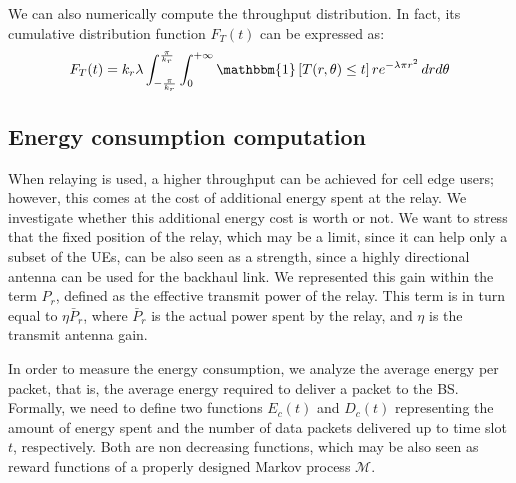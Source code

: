 \documentclass[12pt, letterpaper, onecolumn, draftcls]{IEEEtran}
\begin{document}
We can also numerically compute the throughput distribution. In fact, its cumulative distribution function $F_T(t)$ can be expressed as:
\begin{equation}
 F_T(t) = k_r\lambda\int_{-\frac{\pi}{k_r}}^{\frac{\pi}{k_r}}\int_{0}^{+\infty}\mathbbm{1}\left[T(r,\theta)\leq t\right] re^{-\lambda\pi r^2}\,drd\theta
 \label{disthro}
\end{equation}

\subsection{Energy consumption computation}
When relaying is used, a higher throughput can be achieved for cell edge users; however, this comes at the cost of additional energy spent at the relay. We investigate whether this additional energy cost is worth or not. We want to stress that the fixed position of the relay, which may be a limit, since it can help only a subset of the UEs, can be also seen as a strength, since a highly directional antenna can be used for the backhaul link. We represented this gain within the term $P_r$, defined as the effective transmit power of the relay. This term is in turn equal to $\eta \bar{P}_r$, where $\bar{P}_r$ is the actual power spent by the relay, and $\eta$ is the transmit antenna gain.

In order to measure the energy consumption, we analyze the average energy per packet, that is, the average energy required to deliver a packet to the BS. Formally, we need to define two functions $E_c(t)$ and $D_c(t)$ representing the amount of energy spent and the number of data packets delivered up to time slot $t$, respectively. Both are non decreasing functions, which may be also seen as reward functions of a properly designed Markov process $\mathcal{M}$.
\end{document}
